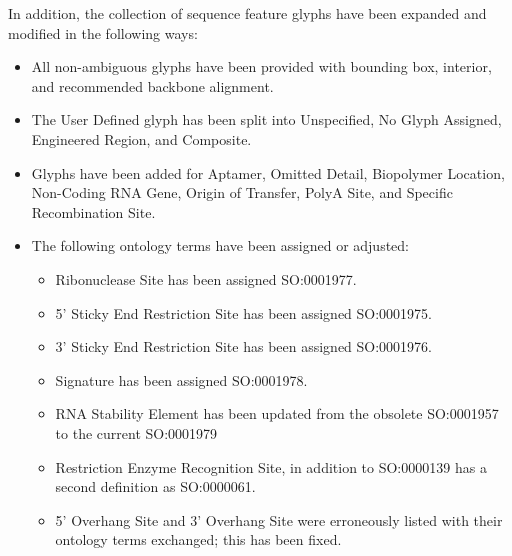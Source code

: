 In addition, the collection of sequence feature glyphs have been expanded and modified in the following ways:
\begin{itemize}
\item All non-ambiguous glyphs have been provided with bounding box, interior, and recommended backbone alignment.
\item The User Defined glyph has been split into Unspecified, No Glyph Assigned, Engineered Region, and Composite. 
\item Glyphs have been added for Aptamer, Omitted Detail, Biopolymer Location, Non-Coding RNA Gene, Origin of Transfer, PolyA Site, and Specific Recombination Site.
\item The following ontology terms have been assigned or adjusted: 
	\begin{itemize}
	\item Ribonuclease Site has been assigned SO:0001977.
	\item 5' Sticky End Restriction Site has been assigned SO:0001975.
	\item 3' Sticky End Restriction Site has been assigned SO:0001976.
	\item Signature has been assigned SO:0001978.
	\item RNA Stability Element has been updated from the obsolete SO:0001957 to the current SO:0001979
	\item Restriction Enzyme Recognition Site, in addition to SO:0000139 has a second definition as SO:0000061.
	\item 5' Overhang Site and 3' Overhang Site were erroneously listed with their ontology terms exchanged; this has been fixed.
	\end{itemize}
\end{itemize}

